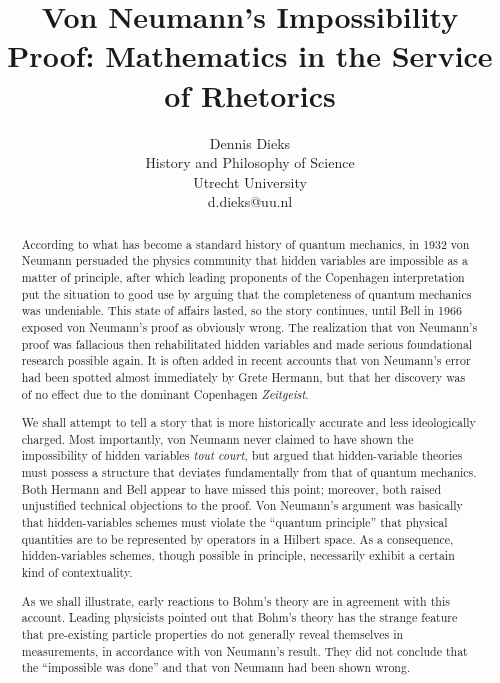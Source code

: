 \documentclass[11pt]{article}
\begin{document}
\date{}
\title{Von Neumann's Impossibility Proof: Mathematics in the Service of Rhetorics}
\author{Dennis Dieks \\History and Philosophy of Science\\
Utrecht University\\ d.dieks@uu.nl}
\maketitle
\begin{abstract}
According to what has become a standard history of quantum mechanics, in 1932 von Neumann persuaded the physics community that hidden variables are impossible as a matter of principle, after which leading proponents of the Copenhagen interpretation put the situation to good use by arguing that the completeness of quantum mechanics was undeniable. This state of affairs lasted, so the story continues, until Bell in 1966 exposed von Neumann's proof as obviously wrong. The realization that von Neumann's proof was fallacious then rehabilitated hidden variables and made serious foundational research possible again. It is often added in recent accounts that von Neumann's error had been spotted almost immediately by Grete Hermann, but that her discovery was of no effect due to the dominant Copenhagen \emph{Zeitgeist}.

We shall attempt to tell a story that is more historically accurate and less ideologically charged. Most importantly, von Neumann never claimed to have shown the impossibility of hidden variables \emph{tout court}, but argued that hidden-variable theories must possess a structure that deviates fundamentally from that of quantum mechanics. Both Hermann and Bell appear to have missed this point; moreover, both raised unjustified technical objections to the proof. Von Neumann's argument was basically that hidden-variables schemes must violate the ``quantum principle'' that physical quantities are to be represented by operators in a Hilbert space. As a consequence, hidden-variables schemes, though possible in principle, necessarily exhibit a certain kind of contextuality.

As we shall illustrate, early reactions to Bohm's theory are in agreement with this account. Leading physicists pointed out that Bohm's theory has the strange feature that pre-existing particle properties do not generally reveal themselves in measurements, in accordance with von Neumann's result.  They did not conclude that the ``impossible was done'' and that von Neumann had been shown wrong.

 \end{abstract}
\end{document}
